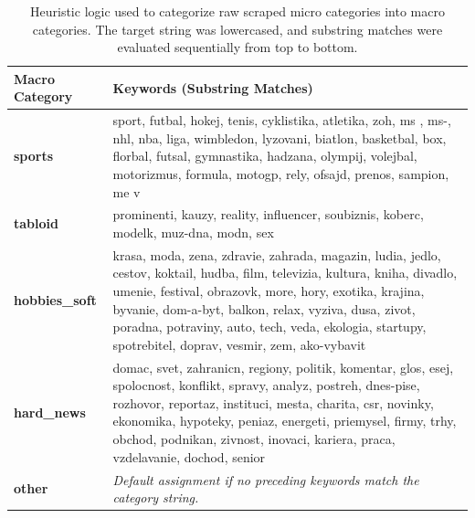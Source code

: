 \documentclass[11pt,a4paper]{article}
\begin{document}
\begin{table}[H]
	\centering
	\small
	\begin{tabular}{@{}lp{11.5cm}@{}}
		\toprule
		\textbf{Macro Category} & \textbf{Keywords (Substring Matches)}                                                                                                                                                                                                                                                                                                                   \\ \midrule
		\textbf{sports}         & sport, futbal, hokej, tenis, cyklistika, atletika, zoh, ms , ms-, nhl, nba, liga, wimbledon, lyzovani, biatlon, basketbal, box, florbal, futsal, gymnastika, hadzana, olympij, volejbal, motorizmus, formula, motogp, rely, ofsajd, prenos, sampion, me v                                                                                               \\ \midrule
		\textbf{tabloid}        & prominenti, kauzy, reality, influencer, soubiznis, koberc, modelk, muz-dna, modn, sex                                                                                                                                                                                                                                                                   \\ \midrule
		\textbf{hobbies\_soft}  & krasa, moda, zena, zdravie, zahrada, magazin, ludia, jedlo, cestov, koktail, hudba, film, televizia, kultura, kniha, divadlo, umenie, festival, obrazovk, more, hory, exotika, krajina, byvanie, dom-a-byt, balkon, relax, vyziva, dusa, zivot, poradna, potraviny, auto, tech, veda, ekologia, startupy, spotrebitel, doprav, vesmir, zem, ako-vybavit \\ \midrule
		\textbf{hard\_news}     & domac, svet, zahranicn, regiony, politik, komentar, glos, esej, spolocnost, konflikt, spravy, analyz, postreh, dnes-pise, rozhovor, reportaz, instituci, mesta, charita, csr, novinky, ekonomika, hypoteky, peniaz, energeti, priemysel, firmy, trhy, obchod, podnikan, zivnost, inovaci, kariera, praca, vzdelavanie, dochod, senior                   \\ \midrule
		\textbf{other}          & \textit{Default assignment if no preceding keywords match the category string.}                                                                                                                                                                                                                                                                         \\ \bottomrule
	\end{tabular}
	\caption{Heuristic logic used to categorize raw scraped micro categories into macro categories. The target string was lowercased, and substring matches were evaluated sequentially from top to bottom.}
	\label{tab:macro_cat_split}
\end{table}
\end{document}
